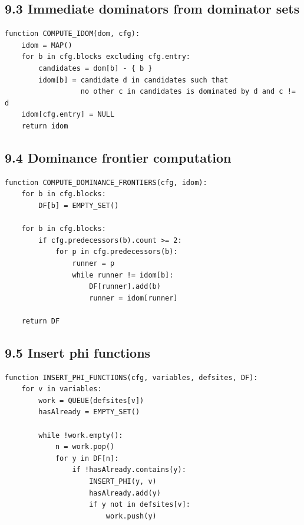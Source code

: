 \documentclass[10pt,letterpaper]{article}
\begin{document}
\subsection*{9.3 Immediate dominators from dominator sets}

\begin{verbatim}
function COMPUTE_IDOM(dom, cfg):
    idom = MAP()
    for b in cfg.blocks excluding cfg.entry:
        candidates = dom[b] - { b }
        idom[b] = candidate d in candidates such that
                  no other c in candidates is dominated by d and c != d
    idom[cfg.entry] = NULL
    return idom
\end{verbatim}

\subsection*{9.4 Dominance frontier computation}

\begin{verbatim}
function COMPUTE_DOMINANCE_FRONTIERS(cfg, idom):
    for b in cfg.blocks:
        DF[b] = EMPTY_SET()

    for b in cfg.blocks:
        if cfg.predecessors(b).count >= 2:
            for p in cfg.predecessors(b):
                runner = p
                while runner != idom[b]:
                    DF[runner].add(b)
                    runner = idom[runner]

    return DF
\end{verbatim}

\subsection*{9.5 Insert phi functions}

\begin{verbatim}
function INSERT_PHI_FUNCTIONS(cfg, variables, defsites, DF):
    for v in variables:
        work = QUEUE(defsites[v])
        hasAlready = EMPTY_SET()

        while !work.empty():
            n = work.pop()
            for y in DF[n]:
                if !hasAlready.contains(y):
                    INSERT_PHI(y, v)
                    hasAlready.add(y)
                    if y not in defsites[v]:
                        work.push(y)
\end{verbatim}
\end{document}
